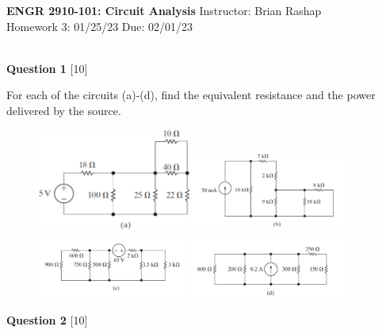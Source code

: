 \documentclass[12pt]{article}
\begin{document}
\begin{center}
\hfil
{\large\bf {ENGR 2910-101: Circuit Analysis}}
\hfill Instructor: Brian Rashap\\
Homework 3: 01/25/23 \hfill Due: 02/01/23\\
\hrulefill\\
\end{center}

{\bf Question 1} [10] %

For each of the circuits (a)-(d), find the equivalent resistance and the power delivered by the source. 
\begin{figure}[h!]
  \centering 
 \vspace{-0.1in}
 \includegraphics[clip,width=0.45\textwidth]{Fig3-3a.png}
 \includegraphics[clip,width=0.45\textwidth]{Fig3-3b.png}\\
 \includegraphics[clip,width=0.45\textwidth]{Fig3-3c.png}
 \includegraphics[clip,width=0.45\textwidth]{Fig3-3d.png}
\end{figure}

\vspace{0.1in}
\noindent
{\bf Question 2} [10] %
\end{document}
